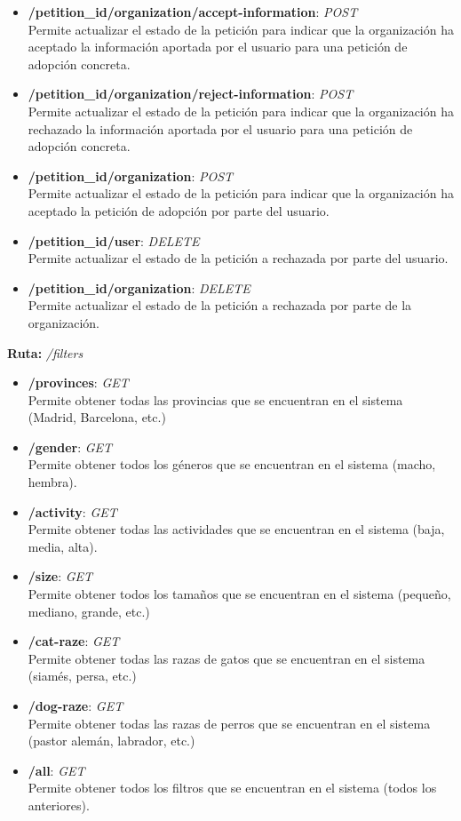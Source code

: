 \begin{itemize}
    \item \textbf{/{petition\_id}/organization/accept-information}: \textit{POST} \\
    Permite actualizar el estado de la petición para indicar que la organización ha aceptado la información aportada por el usuario para una petición de adopción concreta.
    \item \textbf{/{petition\_id}/organization/reject-information}: \textit{POST} \\
    Permite actualizar el estado de la petición para indicar que la organización ha rechazado la información aportada por el usuario para una petición de adopción concreta.
    \item \textbf{/{petition\_id}/organization}: \textit{POST} \\
    Permite actualizar el estado de la petición para indicar que la organización ha aceptado la petición de adopción por parte del usuario.
    \item \textbf{/{petition\_id}/user}: \textit{DELETE} \\
    Permite actualizar el estado de la petición a rechazada por parte del usuario.
    \item \textbf{/{petition\_id}/organization}: \textit{DELETE} \\
    Permite actualizar el estado de la petición a rechazada por parte de la organización.
\end{itemize}

\newpage

\textbf{Ruta:} \textit{/filters}

\begin{itemize}
    \item \textbf{/provinces}: \textit{GET} \\
    Permite obtener todas las provincias que se encuentran en el sistema (Madrid, Barcelona, etc.)
    \item \textbf{/gender}: \textit{GET} \\
    Permite obtener todos los géneros que se encuentran en el sistema (macho, hembra).
    \item \textbf{/activity}: \textit{GET} \\
    Permite obtener todas las actividades que se encuentran en el sistema (baja, media, alta).
    \item \textbf{/size}: \textit{GET} \\
    Permite obtener todos los tamaños que se encuentran en el sistema (pequeño, mediano, grande, etc.)
    \item \textbf{/cat-raze}: \textit{GET} \\
    Permite obtener todas las razas de gatos que se encuentran en el sistema (siamés, persa, etc.)
    \item \textbf{/dog-raze}: \textit{GET} \\
    Permite obtener todas las razas de perros que se encuentran en el sistema (pastor alemán, labrador, etc.)
    \item \textbf{/all}: \textit{GET} \\
    Permite obtener todos los filtros que se encuentran en el sistema (todos los anteriores).
\end{itemize}

